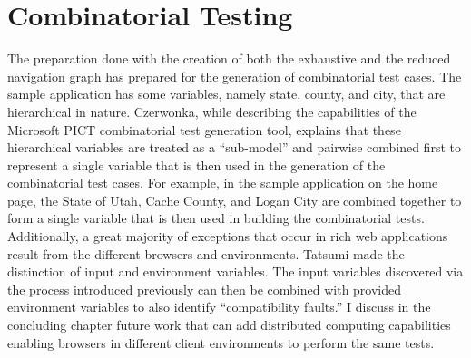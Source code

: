 \section{Combinatorial Testing}
The preparation done with the creation of both the exhaustive and the reduced navigation graph has prepared for the generation of combinatorial test cases.  The sample application has some variables, namely state, county, and city, that are hierarchical in nature.  Czerwonka\cite{czerwonka2008pairwise}, while describing the capabilities of the Microsoft PICT combinatorial test generation tool, explains that these hierarchical variables are treated as a ``sub-model'' and pairwise combined first to represent a single variable that is then used in the generation of the combinatorial test cases.  For example, in the sample application on the home page, the State of Utah, Cache County, and Logan City are combined together to form a single variable that is then used in building the combinatorial tests.  Additionally, a great majority of exceptions that occur in rich web applications result from the different browsers and environments.  Tatsumi\cite{grochtmann1995test} made the distinction of input and environment variables.  The input variables discovered via the process introduced previously can then be combined with provided environment variables to also identify ``compatibility faults.''  I discuss in the concluding chapter future work that can add distributed computing capabilities enabling browsers in different client environments to perform the same tests.